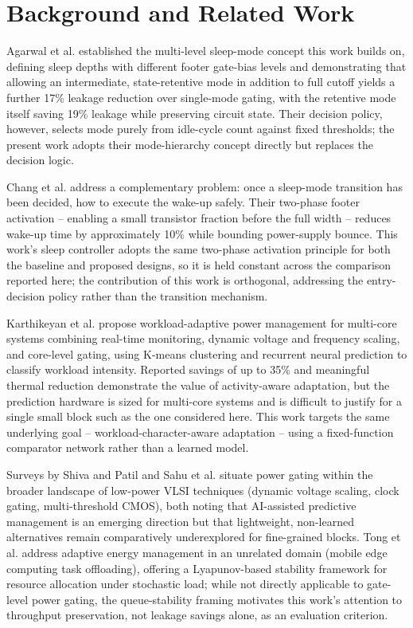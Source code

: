 \section{Background and Related Work}
\label{sec:related}

Agarwal et al. \cite{agarwal2006} established the multi-level sleep-mode concept this work builds on, defining sleep depths with different footer gate-bias levels and demonstrating that allowing an intermediate, state-retentive mode in addition to full cutoff yields a further 17\% leakage reduction over single-mode gating, with the retentive mode itself saving 19\% leakage while preserving circuit state. Their decision policy, however, selects mode purely from idle-cycle count against fixed thresholds; the present work adopts their mode-hierarchy concept directly but replaces the decision logic.

Chang et al. \cite{chang2012} address a complementary problem: once a sleep-mode transition has been decided, how to execute the wake-up safely. Their two-phase footer activation -- enabling a small transistor fraction before the full width -- reduces wake-up time by approximately 10\% while bounding power-supply bounce. This work's sleep controller adopts the same two-phase activation principle for both the baseline and proposed designs, so it is held constant across the comparison reported here; the contribution of this work is orthogonal, addressing the entry-decision policy rather than the transition mechanism.

Karthikeyan et al. \cite{karthikeyan2025} propose workload-adaptive power management for multi-core systems combining real-time monitoring, dynamic voltage and frequency scaling, and core-level gating, using K-means clustering and recurrent neural prediction to classify workload intensity. Reported savings of up to 35\% and meaningful thermal reduction demonstrate the value of activity-aware adaptation, but the prediction hardware is sized for multi-core systems and is difficult to justify for a single small block such as the one considered here. This work targets the same underlying goal -- workload-character-aware adaptation -- using a fixed-function comparator network rather than a learned model.

Surveys by Shiva and Patil \cite{shiva2025} and Sahu et al. \cite{sahu2025} situate power gating within the broader landscape of low-power VLSI techniques (dynamic voltage scaling, clock gating, multi-threshold CMOS), both noting that AI-assisted predictive management is an emerging direction but that lightweight, non-learned alternatives remain comparatively underexplored for fine-grained blocks. Tong et al. \cite{tong2024} address adaptive energy management in an unrelated domain (mobile edge computing task offloading), offering a Lyapunov-based stability framework for resource allocation under stochastic load; while not directly applicable to gate-level power gating, the queue-stability framing motivates this work's attention to throughput preservation, not leakage savings alone, as an evaluation criterion.

